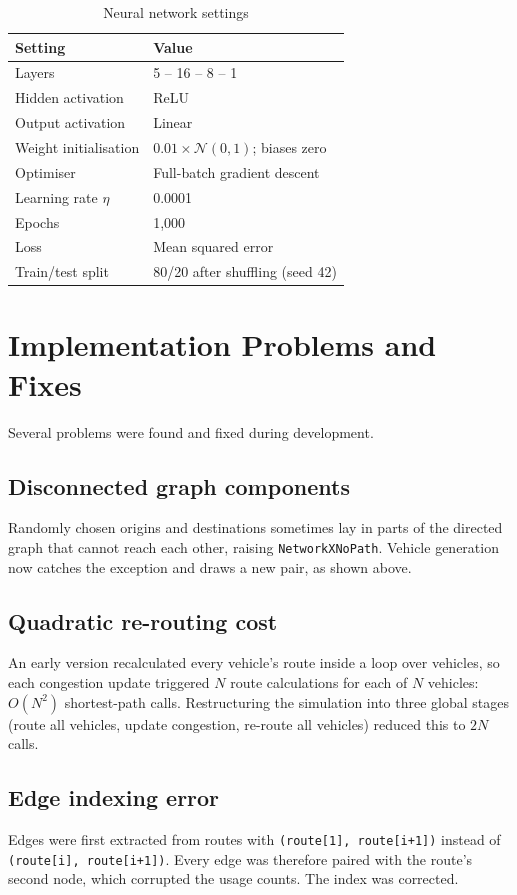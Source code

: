 \documentclass[12pt]{report}
\newcommand{\code}[1]{\texttt{#1}}
\begin{document}
\begin{table}[htbp]
\centering
\caption{Neural network settings}
\label{tab:hyper}
\begin{tabular}{ll}
\toprule
Setting & Value \\
\midrule
Layers & 5 -- 16 -- 8 -- 1 \\
Hidden activation & ReLU \\
Output activation & Linear \\
Weight initialisation & $0.01 \times \mathcal{N}(0,1)$; biases zero \\
Optimiser & Full-batch gradient descent \\
Learning rate $\eta$ & 0.0001 \\
Epochs & 1,000 \\
Loss & Mean squared error \\
Train/test split & 80/20 after shuffling (seed 42) \\
\bottomrule
\end{tabular}
\end{table}

\section{Implementation Problems and Fixes}
\label{sec:debugging}

Several problems were found and fixed during development.

\subsection{Disconnected graph components}
Randomly chosen origins and destinations sometimes lay in parts of the directed graph that cannot reach each other, raising \code{NetworkXNoPath}. Vehicle generation now catches the exception and draws a new pair, as shown above.

\subsection{Quadratic re-routing cost}
An early version recalculated every vehicle's route inside a loop over vehicles, so each congestion update triggered $N$ route calculations for each of $N$ vehicles: $O(N^2)$ shortest-path calls. Restructuring the simulation into three global stages (route all vehicles, update congestion, re-route all vehicles) reduced this to $2N$ calls.

\subsection{Edge indexing error}
Edges were first extracted from routes with \code{(route[1], route[i+1])} instead of \code{(route[i], route[i+1])}. Every edge was therefore paired with the route's second node, which corrupted the usage counts. The index was corrected.
\end{document}
